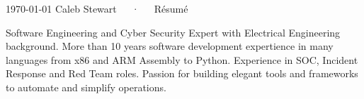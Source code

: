 \documentclass[11pt, letterpaper]{awesome-cv}
\begin{document}
\makecvheader[C]

\makecvfooter
  {\today}
  {Caleb Stewart~~~·~~~Résumé}
  {\thepage}

\begin{cvparagraph}

Software Engineering and Cyber Security Expert with Electrical Engineering background. More than 10 years software development expertience in many languages from x86 and ARM Assembly to Python. Experience in SOC, Incident Response and Red Team roles. Passion for building elegant tools and frameworks to automate and simplify operations.


\end{cvparagraph}
\end{document}
